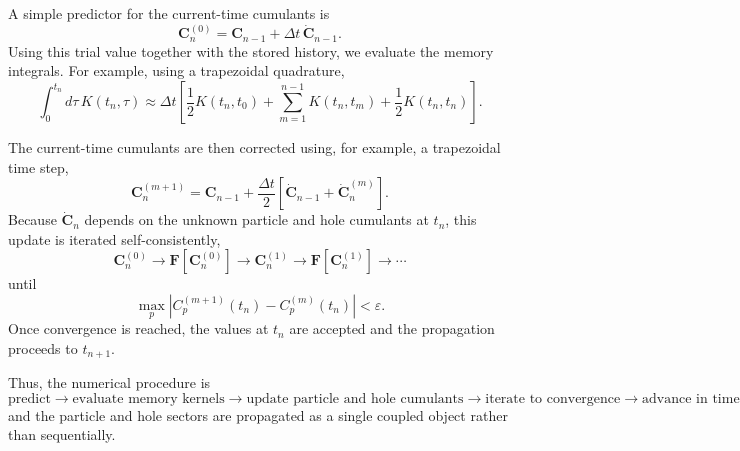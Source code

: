 A simple predictor for the current-time cumulants is
\begin{equation}
\mathbf{C}_n^{(0)}
=
\mathbf{C}_{n-1}
+
\Delta t\,
\dot{\mathbf{C}}_{n-1}.
\end{equation}
Using this trial value together with the stored history, we evaluate the memory integrals. For example, using a trapezoidal quadrature,
\begin{equation}
\int_0^{t_n}d\tau\,
K(t_n,\tau)
\approx
\Delta t
\left[
\frac{1}{2}K(t_n,t_0)
+
\sum_{m=1}^{n-1}
K(t_n,t_m)
+
\frac{1}{2}K(t_n,t_n)
\right].
\end{equation}

The current-time cumulants are then corrected using, for example, a trapezoidal time step,
\begin{equation}
\mathbf{C}_n^{(m+1)}
=
\mathbf{C}_{n-1}
+
\frac{\Delta t}{2}
\left[
\dot{\mathbf{C}}_{n-1}
+
\dot{\mathbf{C}}_n^{(m)}
\right].
\end{equation}
Because $\dot{\mathbf{C}}_n$ depends on the unknown particle and hole cumulants at $t_n$, this update is iterated self-consistently,
\begin{equation}
\mathbf{C}_n^{(0)}
\longrightarrow
\mathbf{F}[\mathbf{C}_n^{(0)}]
\longrightarrow
\mathbf{C}_n^{(1)}
\longrightarrow
\mathbf{F}[\mathbf{C}_n^{(1)}]
\longrightarrow
\cdots
\end{equation}
until
\begin{equation}
\max_p
\left|
C_p^{(m+1)}(t_n)
-
C_p^{(m)}(t_n)
\right|
<
\varepsilon.
\end{equation}
Once convergence is reached, the values at $t_n$ are accepted and the propagation proceeds to $t_{n+1}$.

Thus, the numerical procedure is
\begin{equation}
\boxed{
\text{predict}
\longrightarrow
\text{evaluate memory kernels}
\longrightarrow
\text{update particle and hole cumulants}
\longrightarrow
\text{iterate to convergence}
\longrightarrow
\text{advance in time}
}
\end{equation}
and the particle and hole sectors are propagated as a single coupled object rather than sequentially.

